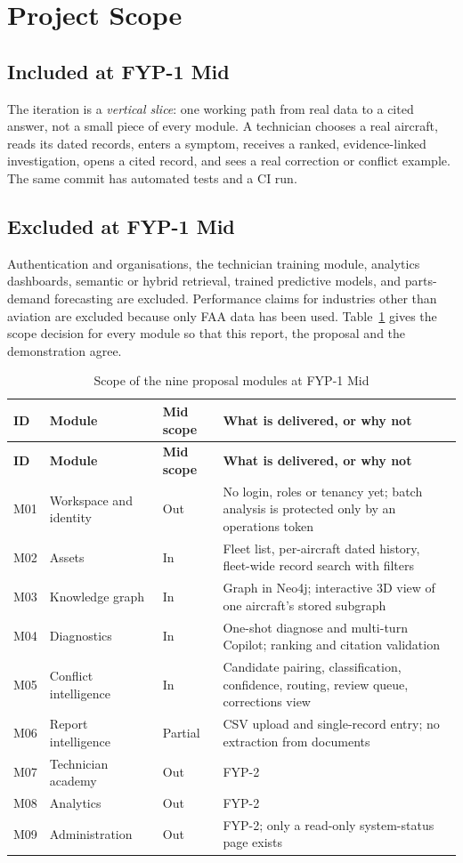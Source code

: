 \section{Project Scope}
\subsection{Included at FYP-1 Mid}
The iteration is a \emph{vertical slice}: one working path from real data to a cited answer, not a small piece of every module. A technician chooses a real aircraft, reads its dated records, enters a symptom, receives a ranked, evidence-linked investigation, opens a cited record, and sees a real correction or conflict example. The same commit has automated tests and a CI run.

\subsection{Excluded at FYP-1 Mid}
Authentication and organisations, the technician training module, analytics dashboards, semantic or hybrid retrieval, trained predictive models, and parts-demand forecasting are excluded. Performance claims for industries other than aviation are excluded because only FAA data has been used. Table~\ref{tab:scope} gives the scope decision for every module so that this report, the proposal and the demonstration agree.

\begin{longtable}{p{}p{}p{}p{}}
\caption{Scope of the nine proposal modules at FYP-1 Mid}\label{tab:scope}\\
\toprule
\textbf{ID} & \textbf{Module} & \textbf{Mid scope} & \textbf{What is delivered, or why not} \\ \midrule \endfirsthead
\toprule \textbf{ID} & \textbf{Module} & \textbf{Mid scope} & \textbf{What is delivered, or why not} \\ \midrule \endhead
M01 & Workspace and identity & Out & No login, roles or tenancy yet; batch analysis is protected only by an operations token \\
M02 & Assets & In & Fleet list, per-aircraft dated history, fleet-wide record search with filters \\
M03 & Knowledge graph & In & Graph in Neo4j; interactive 3D view of one aircraft's stored subgraph \\
M04 & Diagnostics & In & One-shot diagnose and multi-turn Copilot; ranking and citation validation \\
M05 & Conflict intelligence & In & Candidate pairing, classification, confidence, routing, review queue, corrections view \\
M06 & Report intelligence & Partial & CSV upload and single-record entry; no extraction from documents \\
M07 & Technician academy & Out & FYP-2 \\
M08 & Analytics & Out & FYP-2 \\
M09 & Administration & Out & FYP-2; only a read-only system-status page exists \\
\bottomrule
\end{longtable}

